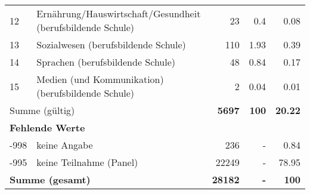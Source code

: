 \begin{longtable}{lXrrr}
     12 &
     \multicolumn{1}{X}{ Ernährung/Hauswirtschaft/Gesundheit (berufsbildende Schule)   } &


       \num{23} &
       \num[round-mode=places,round-precision=2]{0,4} &
         \num[round-mode=places,round-precision=2]{0,08} \\

     13 &
     \multicolumn{1}{X}{ Sozialwesen (berufsbildende Schule)   } &


       \num{110} &
       \num[round-mode=places,round-precision=2]{1,93} &
         \num[round-mode=places,round-precision=2]{0,39} \\

     14 &
     \multicolumn{1}{X}{ Sprachen (berufsbildende Schule)   } &


       \num{48} &
       \num[round-mode=places,round-precision=2]{0,84} &
         \num[round-mode=places,round-precision=2]{0,17} \\

     15 &
     \multicolumn{1}{X}{ Medien (und Kommunikation) (berufsbildende Schule)   } &


       \num{2} &
       \num[round-mode=places,round-precision=2]{0,04} &
         \num[round-mode=places,round-precision=2]{0,01} \\
     \midrule
     \multicolumn{2}{l}{Summe (gültig)} &
       \textbf{\num{5697}} &
     \textbf{100} &
       \textbf{\num[round-mode=places,round-precision=2]{20,22}} \\
     \multicolumn{5}{l}{\textbf{Fehlende Werte}}\\
       -998 &
       keine Angabe &
         \num{236} &
        - &
         \num[round-mode=places,round-precision=2]{0,84} \\
       -995 &
       keine Teilnahme (Panel) &
         \num{22249} &
        - &
         \num[round-mode=places,round-precision=2]{78,95} \\
     \midrule
     \multicolumn{2}{l}{\textbf{Summe (gesamt)}} &
          \textbf{\num{28182}} &
        \textbf{-} &
        \textbf{100} \\
     \bottomrule
     \end{longtable}
     

